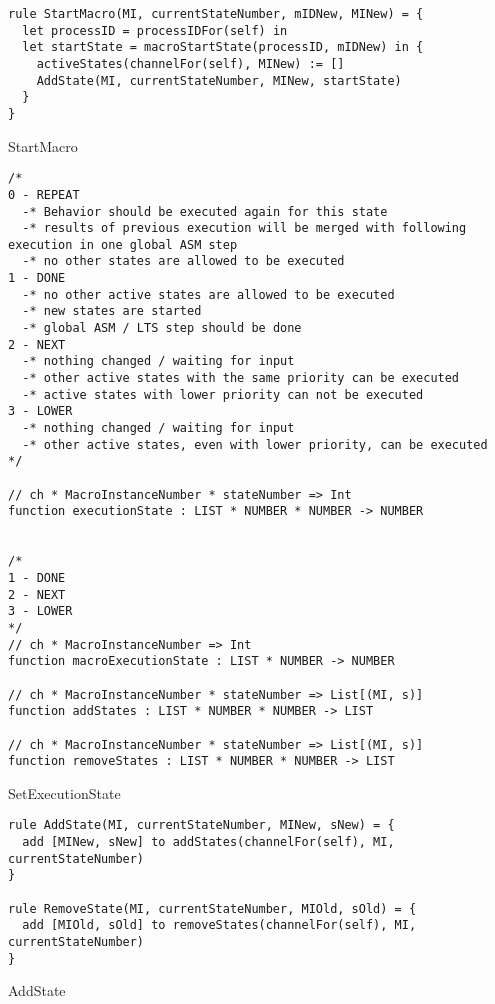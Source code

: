 \begin{listing}[H]
\begin{verbatim}
rule StartMacro(MI, currentStateNumber, mIDNew, MINew) = {
  let processID = processIDFor(self) in
  let startState = macroStartState(processID, mIDNew) in {
    activeStates(channelFor(self), MINew) := []
    AddState(MI, currentStateNumber, MINew, startState)
  }
}
\end{verbatim}
\caption{StartMacro}
\label{lst:asm:StartMacro}
\end{listing}




\begin{listing}[H]
\begin{verbatim}
/*
0 - REPEAT
  -* Behavior should be executed again for this state
  -* results of previous execution will be merged with following execution in one global ASM step
  -* no other states are allowed to be executed
1 - DONE
  -* no other active states are allowed to be executed
  -* new states are started
  -* global ASM / LTS step should be done
2 - NEXT
  -* nothing changed / waiting for input
  -* other active states with the same priority can be executed
  -* active states with lower priority can not be executed
3 - LOWER
  -* nothing changed / waiting for input
  -* other active states, even with lower priority, can be executed
*/

// ch * MacroInstanceNumber * stateNumber => Int
function executionState : LIST * NUMBER * NUMBER -> NUMBER


/*
1 - DONE
2 - NEXT
3 - LOWER
*/
// ch * MacroInstanceNumber => Int
function macroExecutionState : LIST * NUMBER -> NUMBER

// ch * MacroInstanceNumber * stateNumber => List[(MI, s)]
function addStates : LIST * NUMBER * NUMBER -> LIST

// ch * MacroInstanceNumber * stateNumber => List[(MI, s)]
function removeStates : LIST * NUMBER * NUMBER -> LIST
\end{verbatim}
\caption{SetExecutionState}
\label{lst:asm:SetExecutionState}
\end{listing}




\begin{listing}[H]
\begin{verbatim}
rule AddState(MI, currentStateNumber, MINew, sNew) = {
  add [MINew, sNew] to addStates(channelFor(self), MI, currentStateNumber)
}

rule RemoveState(MI, currentStateNumber, MIOld, sOld) = {
  add [MIOld, sOld] to removeStates(channelFor(self), MI, currentStateNumber)
}
\end{verbatim}
\caption{AddState}
\label{lst:asm:AddState}
\end{listing}







